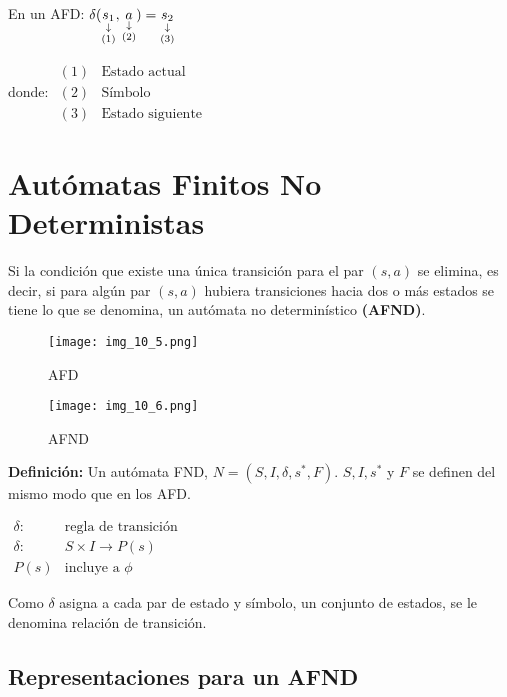 En un AFD: $\delta( \downlegend{s_1}{(1)},\downlegend{a}{(2)})=\downlegend{s_2}{(3)}$

donde: $\begin{array}{cl}
			(1)	& 	\mbox{Estado actual} \\
			(2)	&	\mbox{Símbolo}	\\
			(3)	&	\mbox{Estado siguiente}
\end{array}$

\section{Autómatas Finitos No Deterministas}

Si la condición que existe una única transición para el par $(s,a)$ se elimina, es decir, si para algún par $(s,a)$ hubiera transiciones hacia dos o más estados se tiene lo que se denomina, un autómata no determinístico \textbf{(AFND)}.

\begin{figure}[h!]
\centering
\texttt{[image: img\_10\_5.png]}
\caption{AFD}\label{img_10_5}
\end{figure}

\begin{figure}[h!]
\centering
\texttt{[image: img\_10\_6.png]}
\caption{AFND}\label{img_10_6}
\end{figure}

\textbf{Definición: }Un autómata FND, $N=(S,I,\delta,s^*,F)$. $S,I,s^*$ y $F$ se definen del mismo modo que en los AFD.

\begin{center}
$\begin{array}{ll}
\delta:	&\mbox{regla de transición}	\\
\delta:	& S\times I \rightarrow P(s)	\\
P(s)	&\mbox{incluye a } \phi
\end{array}$
\end{center}

Como $\delta$ asigna a cada par de estado y símbolo, un conjunto de estados, se le denomina relación de transición.

\subsection{Representaciones para un AFND}

